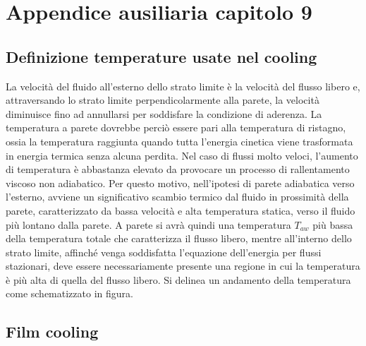 \section{Appendice ausiliaria capitolo 9}
\label{appendix:cooling_temp_definitions}

\subsection{Definizione temperature usate nel cooling}

La velocità del fluido all'esterno dello strato limite è la velocità del flusso libero e, attraversando lo strato limite perpendicolarmente alla parete, la velocità diminuisce fino ad annullarsi per soddisfare la condizione di aderenza. La temperatura a parete dovrebbe perciò essere pari alla temperatura di ristagno, ossia la temperatura raggiunta quando tutta l'energia cinetica viene trasformata in energia termica senza alcuna perdita. Nel caso di flussi molto veloci, l'aumento di temperatura è abbastanza elevato da provocare un processo di rallentamento viscoso non adiabatico. Per questo motivo, nell'ipotesi di parete adiabatica verso l'esterno, avviene un significativo scambio termico dal fluido in prossimità della parete, caratterizzato da bassa velocità e alta temperatura statica, verso il fluido più lontano dalla parete. A parete si avrà quindi una temperatura $T_{aw}$ più bassa della temperatura totale che caratterizza il flusso libero, mentre all'interno dello strato limite, affinché venga soddisfatta l'equazione dell'energia per flussi stazionari, deve essere necessariamente presente una regione in cui la temperatura è più alta di quella del flusso libero. Si delinea un andamento della temperatura come schematizzato in figura.
\vspace{20pt}

\subsection{Film cooling}


